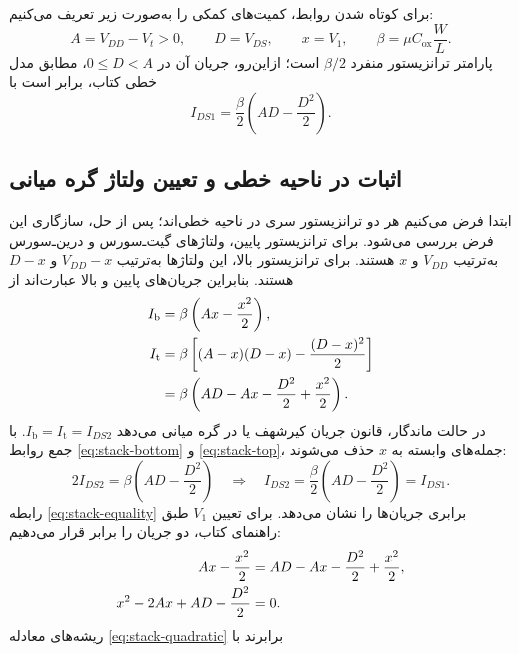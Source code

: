 برای کوتاه شدن روابط، کمیت‌های کمکی را به‌صورت زیر تعریف می‌کنیم:
\begin{equation}
 A=V_{DD}-V_t>0,\qquad D=V_{DS},\qquad x=V_1,
 \qquad \beta=\mu C_{\mathrm{ox}}\frac{W}{L}.
 \label{eq:stack-definitions}
\end{equation}
پارامتر ترانزیستور منفرد \(\beta/2\) است؛ ازاین‌رو، جریان آن در \(0\le D<A\)، مطابق مدل خطی کتاب، برابر است با
\cite[رابطه ، صفحه چاپی ۶۶]{weste}
\begin{equation}
 I_{DS1}=\frac{\beta}{2}\left(AD-\frac{D^2}{2}\right).
 \label{eq:stack-single}
\end{equation}

\subsection*{اثبات در ناحیه خطی و تعیین ولتاژ گره میانی}
ابتدا فرض می‌کنیم هر دو ترانزیستور سری در ناحیه خطی‌اند؛ پس از حل، سازگاری این فرض بررسی می‌شود.
برای ترانزیستور پایین، ولتاژهای گیت‌ـ‌سورس و درین‌ـ‌سورس به‌ترتیب \(V_{DD}\) و \(x\) هستند.
برای ترانزیستور بالا، این ولتاژها به‌ترتیب \(V_{DD}-x\) و \(D-x\) هستند.
بنابراین جریان‌های پایین و بالا عبارت‌اند از
\begin{align}
 I_{\mathrm{b}}&=\beta\left(Ax-\frac{x^2}{2}\right),
 \label{eq:stack-bottom}\\
 I_{\mathrm{t}}&=\beta\left[(A-x)(D-x)-\frac{(D-x)^2}{2}\right]\notag\\
 &=\beta\left(AD-Ax-\frac{D^2}{2}+\frac{x^2}{2}\right).
 \label{eq:stack-top}
\end{align}
در حالت ماندگار، قانون جریان کیرشهف یا  در گره میانی می‌دهد
\(I_{\mathrm{b}}=I_{\mathrm{t}}=I_{DS2}\).
با جمع روابط \eqref{eq:stack-bottom} و \eqref{eq:stack-top}، جمله‌های وابسته به \(x\) حذف می‌شوند:
\begin{equation}
 2I_{DS2}=\beta\left(AD-\frac{D^2}{2}\right)
 \quad\Longrightarrow\quad
 \boxed{I_{DS2}=\frac{\beta}{2}\left(AD-\frac{D^2}{2}\right)=I_{DS1}.}
 \label{eq:stack-equality}
\end{equation}
رابطه \eqref{eq:stack-equality} برابری جریان‌ها را نشان می‌دهد. برای تعیین \(V_1\) طبق راهنمای کتاب، دو جریان را برابر قرار می‌دهیم:
\begin{align}
 Ax-\frac{x^2}{2}&=AD-Ax-\frac{D^2}{2}+\frac{x^2}{2},\notag\\
 x^2-2Ax+AD-\frac{D^2}{2}&=0.
 \label{eq:stack-quadratic}
\end{align}
ریشه‌های معادله \eqref{eq:stack-quadratic} برابرند با
